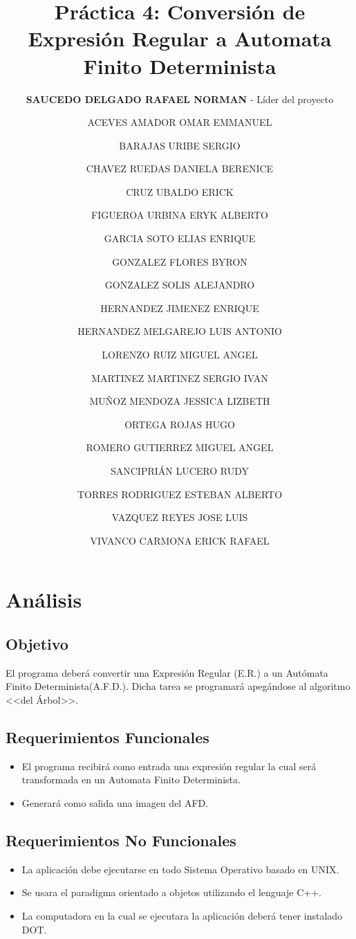 \documentclass{report}
\title{{\bf Práctica 4:} Conversión de Expresión Regular a Automata Finito Determinista}
\author{{\bf SAUCEDO DELGADO RAFAEL NORMAN} {- Líder del proyecto}
\and ACEVES AMADOR OMAR EMMANUEL
\and BARAJAS URIBE SERGIO
\and CHAVEZ RUEDAS DANIELA BERENICE
\and CRUZ UBALDO ERICK
\and FIGUEROA URBINA ERYK ALBERTO
\and GARCIA SOTO ELIAS ENRIQUE
\and GONZALEZ FLORES BYRON
\and GONZALEZ SOLIS ALEJANDRO
\and HERNANDEZ JIMENEZ ENRIQUE
\and HERNANDEZ MELGAREJO LUIS ANTONIO
\and LORENZO RUIZ MIGUEL ANGEL
\and MARTINEZ MARTINEZ SERGIO IVAN
\and MUÑOZ MENDOZA JESSICA LIZBETH
\and ORTEGA ROJAS HUGO
\and ROMERO GUTIERREZ MIGUEL ANGEL
\and SANCIPRIÁN LUCERO RUDY
\and TORRES RODRIGUEZ ESTEBAN ALBERTO
\and VAZQUEZ REYES JOSE LUIS
\and VIVANCO CARMONA ERICK RAFAEL
}
\begin{document}
\maketitle
\tableofcontents

\chapter{Análisis}


\section{Objetivo}
El programa deberá convertir una Expresión Regular (E.R.) a un Autómata Finito Determinista(A.F.D.).
Dicha tarea se programará apegándose al algoritmo <<del Árbol>>.


\section{Requerimientos Funcionales}
\begin{itemize}
	\item El programa recibirá como entrada una expresión regular la cual será transformada en un Automata Finito Determinista.
	\item Generará como salida una imagen del AFD.
\end{itemize}


\section{Requerimientos No Funcionales}
\begin{itemize}
	\item La aplicación debe ejecutarse en todo Sistema Operativo basado en UNIX.
	\item Se usara el paradigma orientado a objetos utilizando el lenguaje C++.
	\item La computadora en la cual se ejecutara la aplicación deberá tener instalado DOT.
\end{itemize}
\end{document}
